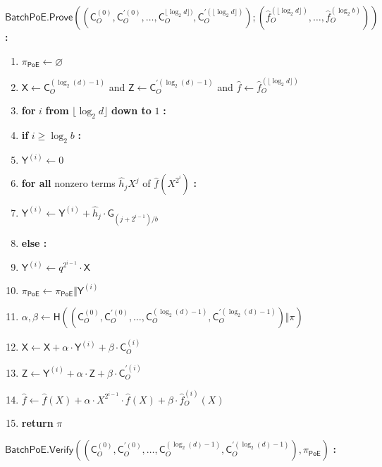 \documentclass[11pt]{article}
\theoremstyle{Definition}
\begin{document}
\begin{mdframed}
$\mathsf{BatchPoE.Prove}((\mathsf{C}_O^{(0)}, \mathsf{C}_O^{\prime(0)}, \ldots, \mathsf{C}_O^{\lfloor\log_2 d \rfloor)}, \mathsf{C}_O^{\prime(\lfloor\log_2 d\rfloor)}); (\hat{f}_O^{(\lfloor \log_2 d\rfloor)}, \ldots, \hat{f}_O^{(\log_2 b)}))$ \textbf{:}
\begin{enumerate}[nolistsep]
	\item $\pi_{\mathsf{PoE}} \gets \varnothing$
	\item $\mathsf{X} \gets \mathsf{C}_O^{(\log_2(d)-1)}$ and $\mathsf{Z} \gets \mathsf{C}_O^{\prime(\log_2(d)-1)}$ and $\hat{f} \gets \hat{f}_O^{(\lfloor \log_2 d \rfloor)}$
	\item \textbf{for} $i$ \textbf{from} $\lfloor \log_2 d \rfloor$ \textbf{down to} $1$ \textbf{:}
	\item \pcind \textbf{if} $i \geq \log_2 b$ \textbf{:} 
	\item \pcind \pcind $\mathsf{Y}^{(i)} \gets 0$
	\item \pcind \pcind \textbf{for all} nonzero terms $\hat{h}_jX^j$ of $\hat{f}(X^{2^i})$ \textbf{:}
	\item \pcind \pcind \pcind $\mathsf{Y}^{(i)} \gets \mathsf{Y}^{(i)} + \hat{h}_j \cdot \mathsf{G}_{(j+2^{i-1})/b}$
	\item \pcind \textbf{else :}
	\item \pcind \pcind $\mathsf{Y}^{(i)} \gets q^{2^{i-1}} \cdot \mathsf{X}$ \label{line:batchpoeverify-q}
	\item \pcind $\pi_{\mathsf{PoE}} \gets \pi_{\mathsf{PoE}} \Vert \mathsf{Y}^{(i)}$
	\item \pcind $\alpha, \beta \gets \mathsf{H}((\mathsf{C}_O^{(0)}, \mathsf{C}_O^{\prime(0)}, \ldots, \mathsf{C}_O^{(\log_2(d)-1)}, \mathsf{C}_O^{\prime(\log_2(d)-1)}) \Vert \pi)$ 
	\item \pcind $\mathsf{X} \gets \mathsf{X} + \alpha \cdot \mathsf{Y}^{(i)} + \beta \cdot \mathsf{C}_O^{(i)}$ \label{line:batchpoeverify-regular}
	\item \pcind $\mathsf{Z} \gets \mathsf{Y}^{(i)} + \alpha \cdot \mathsf{Z} + \beta \cdot \mathsf{C}_O^{\prime(i)}$\label{line:batchpoeverify-prime}
	\item \pcind $\hat{f} \gets \hat{f}(X) + \alpha \cdot X^{2^{i-1}} \cdot \hat{f}(X) + \beta \cdot \hat{f}^{(i)}_O(X)$
	\item \textbf{return} $\pi$
\end{enumerate}
$\mathsf{BatchPoE.Verify}((\mathsf{C}_O^{(0)}, \mathsf{C}_O^{\prime(0)}, \ldots, \mathsf{C}_O^{(\log_2(d)-1)}, \mathsf{C}_O^{\prime(\log_2(d)-1)}), \pi_{\mathsf{PoE}})$ \textbf{:}

\end{mdframed}
\end{document}
